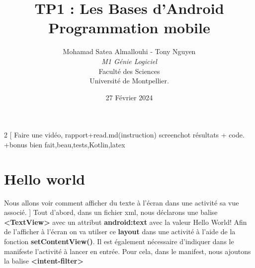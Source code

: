 \documentclass[a4paper]{article}
\title{  TP1 : Les Bases d'Android\\         %
  Programmation mobile}
\author{Mohamad Satea Almallouhi - Tony Nguyen\\
  \emph{M1 Génie Logiciel}\\
  Faculté des Sciences\\
Université de Montpellier.}
\date{27 Février 2024}
\begin{document}
\maketitle                    %




\newpage
\tableofcontents
\newpage

\begin{multicols}{2}
  [
    Faire une vidéo, rapport+read.md(instruction) screenchot résultats + code. +bonus bien fait,beau,tests,Kotlin,latex
  \section{Hello world}
  Nous allons voir comment afficher du texte à l'écran dans une activité sa vue associé.
  ]
  Tout d'abord, dans un fichier xml, nous déclarons une balise \textbf{<TextView>} avec un attribut \textbf{android:text} avec la valeur Hello World!
  Afin de l'afficher à l'écran on va utilser ce \textbf{layout} dans une activité à l'aide de la fonction \textbf{setContentView()}.
  Il est également nécessaire d'indiquer dans le manifeste l'activité à lancer en entrée. Pour cela, dans le manifest, nous ajoutons la balise \textbf{<intent-filter>}

  
\end{multicols}
\end{document}
